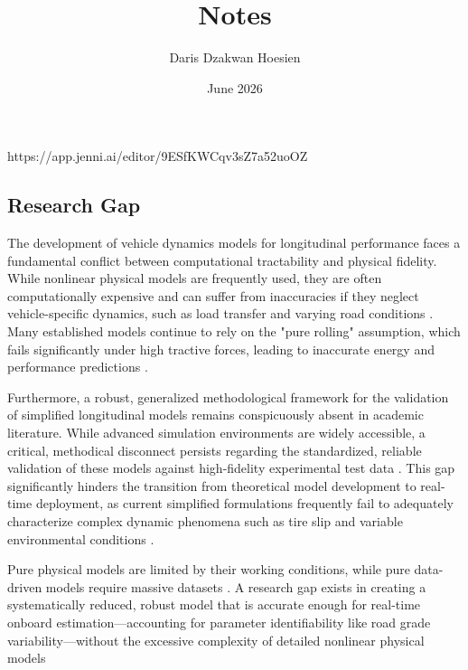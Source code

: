 \documentclass{article}
\title{Notes}
\author{Daris Dzakwan Hoesien}
\date{June 2026}
\begin{document}
\maketitle

https://app.jenni.ai/editor/9ESfKWCqv3sZ7a52uoOZ
\subsection{Research Gap}

The development of vehicle dynamics models for longitudinal performance faces a fundamental conflict between computational tractability and physical fidelity. While nonlinear physical models are frequently used, they are often computationally expensive and can suffer from inaccuracies if they neglect vehicle-specific dynamics, such as load transfer and varying road conditions  \parencite{sebastian_s__james_1e591363}. Many established models continue to rely on the "pure rolling" assumption, which fails significantly under high tractive forces, leading to inaccurate energy and performance predictions  \parencite{naser_sina_57baad9a}.

Furthermore, a robust, generalized methodological framework for the validation of simplified longitudinal models remains conspicuously absent in academic literature. While advanced simulation environments are widely accessible, a critical, methodical disconnect persists regarding the standardized, reliable validation of these models against high-fidelity experimental test data  \parencite[]{sebastian_s__james_1e591363, muhammad_abdullah_7f4e5d18}. This gap significantly hinders the transition from theoretical model development to real-time deployment, as current simplified formulations frequently fail to adequately characterize complex dynamic phenomena such as tire slip and variable environmental conditions  \parencite[]{lorenzo_mosconi_2fca7202, naser_sina_57baad9a}.

Pure physical models are limited by their working conditions, while pure data-driven models require massive datasets  \parencite{zhisong_zhou_c50a6dda}. A research gap exists in creating a systematically reduced, robust model that is accurate enough for real-time onboard estimation—accounting for parameter identifiability like road grade variability—without the excessive complexity of detailed nonlinear physical models  \parencite[]{nour_khoudari_2d5bcaad, sebastian_s__james_30b34609}
\end{document}
